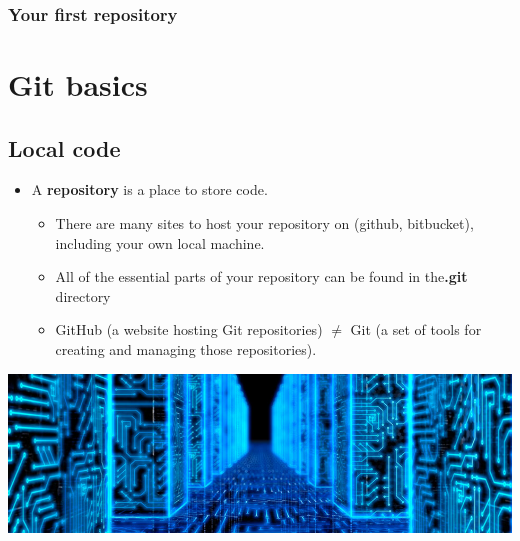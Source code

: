 \documentclass{beamer}
\begin{document}
\begin{frame}[fragile]
\frametitle{Your first repository}

\section{Git basics}

\subsection{Local code}

\begin{itemize}
\item A \textbf{repository} is a place to store code.
\begin{itemize}
\item There are many sites to host your repository on (github, bitbucket), including your own local machine.
\item All of the essential parts of your repository can be found in the\textbf{.git} directory
\item GitHub (a website hosting Git repositories) $\neq$ Git (a set of tools for creating and managing those repositories).
\end{itemize}

\end{itemize}

\includegraphics[width=\textwidth]{Storage.jpg}

\end{frame}
\end{document}
